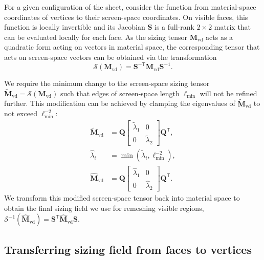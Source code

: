 \documentclass[10pt,journal,compsoc,twoside]{TexInputs/IEEEtran}
\newcommand{\woojong}[1]{\textcolor{magenta}{(#1 ---Woojong)}}
\begin{document}
For a given configuration of the sheet, consider the function from material-space coordinates of vertices to their screen-space coordinates.
On visible faces, this function is locally invertible and its Jacobian $\mathbf S$ is a full-rank $2\times2$ matrix that can be evaluated locally for each face.
As the sizing tensor $\mathbf M_{\text{vd}}$ acts as a quadratic form acting on vectors in material space, the corresponding tensor that acts on screen-space vectors can be obtained via the transformation
\begin{equation}
    \mathcal{S}(\mathbf{M}_{\text{vd}}) = \mathbf{S}^{-\mathsf T}\mathbf{M}_{\text{vd}}\mathbf{S}^{-1}.
\end{equation}

We require the minimum change to the screen-space sizing tensor $\tilde{\mathbf M}_{\text{vd}} = \mathcal S(\mathbf M_{\text{vd}})$ such that edges of screen-space length $\ell_{\min}$ will not be refined further.
This modification can be achieved by clamping the eigenvalues of $\tilde{\mathbf M}_{\text{vd}}$ to not exceed $\ell^{-2}_{\min}$:
\begin{align}
  \tilde{\mathbf{M}}_{\text{vd}} &= \mathbf{Q}\begin{bmatrix}\tilde\lambda_1 & 0 \\ 0 & \tilde\lambda_2\end{bmatrix}\mathbf{Q}^{\mathsf T}, \\
  \hat\lambda_i &= \min(\tilde{\lambda}_i, \ell^{-2}_{\min}), \\
  \hat{\mathbf{M}}_{\text{vd}} &= \mathbf{Q}\begin{bmatrix}\hat\lambda_1 & 0 \\ 0 & \hat\lambda_2\end{bmatrix}\mathbf{Q}^{\mathsf T}.
\end{align}
We transform this modified screen-space tensor back into material space to
obtain the final sizing field we use for remeshing visible regions, $\mathcal
S^{-1}(\hat{\mathbf{M}}_{\text{vd}}) = \mathbf S^{\mathsf T}\hat{\mathbf
M}_{\text{vd}}\mathbf S$.


\subsection{Transferring sizing field from faces to vertices}
\label{sec:silhouette-preserving}
\end{document}
